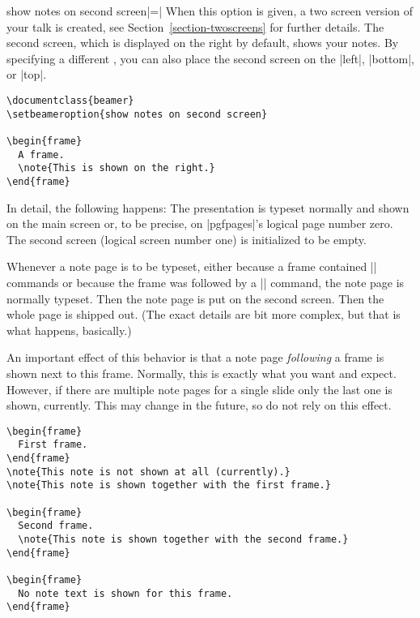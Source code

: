 \begin{beameroption}{show notes on second screen}{|=|}
  \label{command-notesonsecondscreen}
  When this option is given, a two screen version of your talk is created, see Section~\ref{section-twoscreens} for further details. The second screen, which is displayed on the right by default, shows your notes. By   specifying a different , you can also place the second screen on the |left|, |bottom|, or |top|.

  \example
\begin{verbatim}
\documentclass{beamer}
\setbeameroption{show notes on second screen}

\begin{frame}
  A frame.
  \note{This is shown on the right.}
\end{frame}

\end{verbatim}

  In detail, the following happens: The presentation is typeset normally and shown on the main screen or, to be precise, on |pgfpages|'s logical page number zero. The second screen (logical screen number one) is initialized to be empty.

  Whenever a note page is to be typeset, either because a frame contained |\note| commands or because the frame was followed by a |\note| command, the note page is normally typeset. Then the note page is put on the second screen. Then the whole page is shipped out. (The exact details are bit more complex, but that is what happens, basically.)

  An important effect of this behavior is that a note page \emph{following} a frame is shown next to this frame. Normally, this is exactly what you want and expect. However, if there are multiple note pages for a single slide only the last one is shown, currently. This may change in the future, so do not rely on this effect.

  \example
\begin{verbatim}
\begin{frame}
  First frame.
\end{frame}
\note{This note is not shown at all (currently).}
\note{This note is shown together with the first frame.}

\begin{frame}
  Second frame.
  \note{This note is shown together with the second frame.}
\end{frame}

\begin{frame}
  No note text is shown for this frame.
\end{frame}
\end{verbatim}


\end{beameroption}
